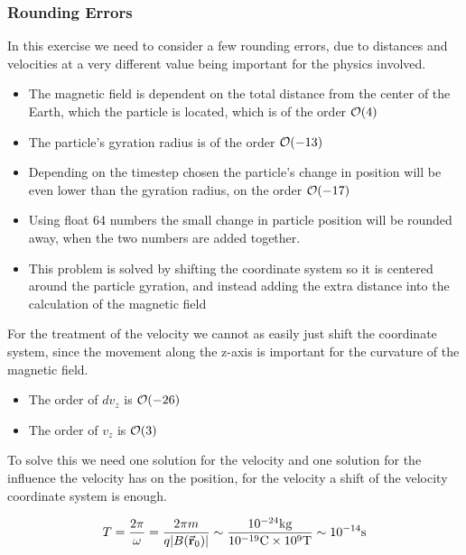 \documentclass[x11names]{article}
\begin{document}
\subsubsection{Rounding Errors}
      In this exercise we need to consider a few rounding errors, due to distances and velocities at a very different value being important for the physics involved.
      \begin{itemize}
            \item The magnetic field is dependent on the total distance from the center of the Earth, which the particle is located, which is of the order \(\order{4}\)
            \item The particle's gyration radius is of the order \(\order{-13}\)
            \item Depending on the timestep chosen the particle's change in position will be even lower than the gyration radius, on the order \(\order{-17}\)
            \item Using float 64 numbers the small change in particle position will be rounded away, when the two numbers are added together.
            \item This problem is solved by shifting the coordinate system so it is centered around the particle gyration, and instead adding the extra distance into the calculation of the magnetic field
      \end{itemize}

      For the treatment of the velocity we cannot as easily just shift the coordinate system, since the movement along the z-axis is important for the curvature of the magnetic field.
      \begin{itemize}
            \item The order of \(dv_z\) is \( \order{-26} \)
            \item The order of \(v_z\) is \( \order{3} \)
      \end{itemize}

      To solve this we need one solution for the velocity and one solution for the influence the velocity has on the position, for the velocity a shift of the velocity coordinate system is enough.
      

      \begin{align}
        T = \frac{2\pi}{\omega} = \frac{2\pi m}{q |B(\va{r}_0)|} \sim \frac{10^{-24}\si{\kilogram}}{10^{-19}\si{\coulomb}\times 10^9 \si{\tesla}} \sim 10^{-14} \si{s}  
      \end{align}
\end{document}
